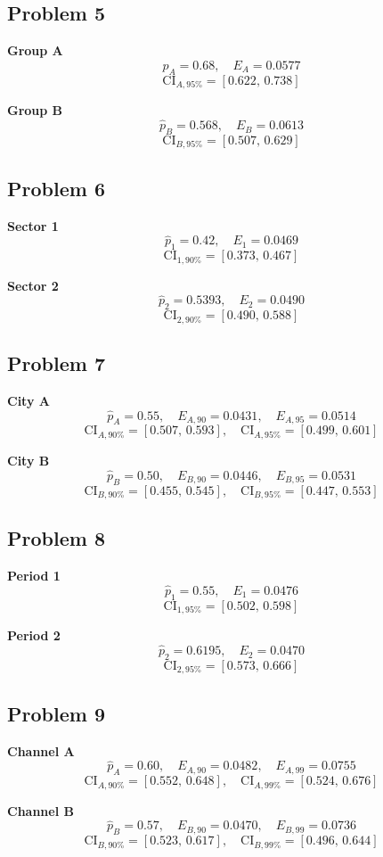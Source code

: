 	\subsection*{Problem 5}
	\textbf{Group A}
	\[
	\hat p_A=0.68,\quad E_A=0.0577
	\]
	\[
	\text{CI}_{A,95\%}=[0.622,\,0.738]
	\]
	
	\textbf{Group B}
	\[
	\hat p_B=0.568,\quad E_B=0.0613
	\]
	\[
	\text{CI}_{B,95\%}=[0.507,\,0.629]
	\]
	
	\subsection*{Problem 6}
	\textbf{Sector 1}
	\[
	\hat p_1=0.42,\quad E_1=0.0469
	\]
	\[
	\text{CI}_{1,90\%}=[0.373,\,0.467]
	\]
	
	\textbf{Sector 2}
	\[
	\hat p_2=0.5393,\quad E_2=0.0490
	\]
	\[
	\text{CI}_{2,90\%}=[0.490,\,0.588]
	\]
	
	\subsection*{Problem 7}
	\textbf{City A}
	\[
	\hat p_A=0.55,\quad E_{A,90}=0.0431,\quad E_{A,95}=0.0514
	\]
	\[
	\text{CI}_{A,90\%}=[0.507,\,0.593],\quad \text{CI}_{A,95\%}=[0.499,\,0.601]
	\]
	
	\textbf{City B}
	\[
	\hat p_B=0.50,\quad E_{B,90}=0.0446,\quad E_{B,95}=0.0531
	\]
	\[
	\text{CI}_{B,90\%}=[0.455,\,0.545],\quad \text{CI}_{B,95\%}=[0.447,\,0.553]
	\]
	
	\subsection*{Problem 8}
	\textbf{Period 1}
	\[
	\hat p_1=0.55,\quad E_1=0.0476
	\]
	\[
	\text{CI}_{1,95\%}=[0.502,\,0.598]
	\]
	
	\textbf{Period 2}
	\[
	\hat p_2=0.6195,\quad E_2=0.0470
	\]
	\[
	\text{CI}_{2,95\%}=[0.573,\,0.666]
	\]
	
	\subsection*{Problem 9}
	\textbf{Channel A}
	\[
	\hat p_A=0.60,\quad E_{A,90}=0.0482,\quad E_{A,99}=0.0755
	\]
	\[
	\text{CI}_{A,90\%}=[0.552,\,0.648],\quad \text{CI}_{A,99\%}=[0.524,\,0.676]
	\]
	
	\textbf{Channel B}
	\[
	\hat p_B=0.57,\quad E_{B,90}=0.0470,\quad E_{B,99}=0.0736
	\]
	\[
	\text{CI}_{B,90\%}=[0.523,\,0.617],\quad \text{CI}_{B,99\%}=[0.496,\,0.644]
	\]
	
